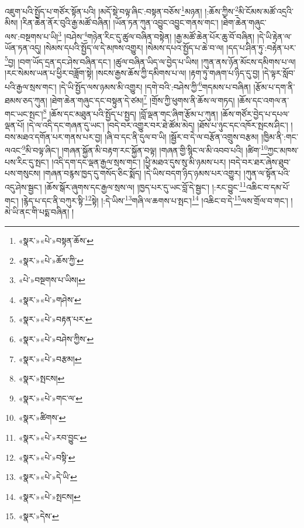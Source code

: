 འཇུག་པའི་སྤྱོད་པ་གཙོར་སྟོན་པའི། །མདོ་སྡེ་བལྟ་ཞིང་:བསྟན་བཅོས་\footnote{«སྣར་»«པེ་»བསྟན་ཆོས་}མཉན། །:ཆོས་ཀྱིས་\footnote{«སྣར་»«པེ་»ཆོས་ཀྱི་}མི་ངོམས་མཚོ་འདྲའི་མིས། །རིན་ཆེན་ནོར་བུའི་རྒྱ་མཚོ་བཞིན། །ཡོན་ཏན་ཀུན་འབྱུང་འབྱུང་གནས་གང་། །ཐེག་ཆེན་གཞུང་ལས་:བསྔགས་པ་ཡི།\footnote{«པེ་»བསྔགས་པ་ཡིས།} །བཤེས་\footnote{«སྣར་»«པེ་»གཤེས་}གཉེན་རིང་དུ་ཚུལ་བཞིན་བསྟེན། །རྒྱ་མཚོ་ཆེན་པོར་ཆུ་བོ་བཞིན། །དེ་ཡི་རྟེན་ལ་ཡོན་ཏན་འདུ། །སེམས་དཔའི་སྤྱོད་ལ་དེ་མཁས་འགྱུར། །སེམས་དཔའ་སྤྱོད་པ་ཆེ་བ་ལ། །དད་པ་ཤིན་ཏུ་:བརྟེན་པར་\footnote{«སྣར་»«པེ་»བརྟན་པར་}བྱ། །བག་ཡོད་དྲན་དང་ཤེས་བཞིན་དང་། །ཚུལ་བཞིན་ཡིད་ལ་བྱེད་པ་ཡིས། །ཀུན་ནས་ཉོན་མོངས་དམིགས་པ་ལ། །རང་སེམས་ཡན་པ་ཕྱིར་བཟློག་སྟེ། །སངས་རྒྱས་ཆོས་ཀྱི་དམིགས་པ་ལ། །རྟག་ཏུ་གཞག་པ་ཉིད་དུ་བྱ། །དེ་ལྟར་སློབ་པའི་རྒྱལ་སྲས་གང་། །དེ་ཡི་སྤྱོད་ལས་ཉམས་མི་འགྱུར། །དགེ་བའི་:བཤེས་ཀྱི་\footnote{«སྣར་»«པེ་»བཤེས་ཀྱིས་}གདམས་པ་བཞིན། །རྩོམ་པ་དག་ནི་ཐམས་ཅད་ཀུན། །ཐེག་ཆེན་གཞུང་དང་བསྟུན་དེ་ཙམ།\footnote{«སྣར་»«པེ་»བརྩམ།} །གྲོས་ཀྱི་ཕུགས་ནི་ཆོས་ལ་གཏད། །ཆོས་དང་འགལ་ན་གང་ཡང་སྤང་།\footnote{«སྣར་»སྤངས།} །ཆོས་དང་མཐུན་པའི་སྤྱོད་པ་སྤྱད། །བློ་ལྡན་གང་ཞིག་རྩོམ་པ་ཀུན། །ཆོས་གཙོར་བྱེད་པ་དཔལ་ལྡན་པོ། །དེ་ལ་འདི་དང་གཞན་དུ་ཡང་། །བདེ་བར་འགྱུར་བར་ཐེ་ཚོམ་མེད། །ཐོས་པ་ཉུང་དང་འཁོར་སྤངས་ཤིང་། །བས་མཐའ་དགོན་པར་གནས་པར་བྱ། །ཞི་བ་དང་ནི་དུལ་བ་ཡི། །སྦྱོར་བ་དེ་ལ་བརྩོན་འགྲུས་བརྩམ། །ཁྱིམ་ནི་:གང་ལའང་\footnote{«སྣར་»«པེ་»གང་ལ་}མི་བལྟ་ཞིང་། །གཞན་སྐྱོན་མི་བརྟག་རང་སྐྱོན་བལྟ། །གཞན་གྱི་སྙིང་ལ་མི་འབབ་པའི། །ཚིག་\footnote{«སྣར་»ཚིགས་}ཀྱང་མཁས་པས་རིང་དུ་སྤང་། །འདི་དག་དང་ལྡན་རྒྱལ་སྲས་གང་། །ཕྱི་མཐའ་དུས་སུ་མི་ཉམས་པར། །བདེ་བར་ཐར་ཞེས་ཐུབ་པས་གསུངས། །གཞན་བརྙས་ཁྱད་དུ་གསོད་ཅིང་སྨོད། །དེ་ཡིས་བདག་ཉིད་ཉམས་པར་འགྱུར། །ཀུན་ལ་སྟོན་པའི་འདུ་ཤེས་སྦྱང་། །ཆོས་སྒོར་ཞུགས་དང་རྒྱལ་སྲས་ལ། །ཁྱད་པར་དུ་ཡང་བློ་དེ་སྦྱང་། །:རང་བྱུང་\footnote{«སྣར་»«པེ་»རབ་བྱུང་}འཆིང་བ་དམ་པོ་གང་། །རྙེད་པ་དང་ནི་བཀུར་སྟི་\footnote{«སྣར་»«པེ་»བསྟི་}སྟེ། །:དེ་ཡིས་\footnote{«སྣར་»«པེ་»དེ་ཡི་}གཞི་ལ་ཆགས་པ་སྤང་།\footnote{«སྣར་»«པེ་»སྤངས།} །འཆིང་བ་དེ་\footnote{«སྣར་»དེས་}ལས་གྲོལ་བ་གང་། །མེ་ཡི་ནང་གི་པདྨ་བཞིན། །
